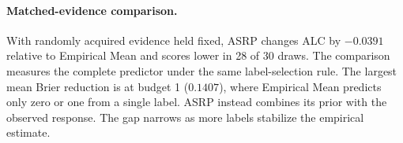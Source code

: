 \paragraph{Matched-evidence comparison.} With randomly acquired evidence held fixed, ASRP changes ALC by $-0.0391$ relative to Empirical Mean and scores lower in 28 of 30 draws. The comparison measures the complete predictor under the same label-selection rule. The largest mean Brier reduction is at budget 1 ($0.1407$), where Empirical Mean predicts only zero or one from a single label. ASRP instead combines its prior with the observed response. The gap narrows as more labels stabilize the empirical estimate.
